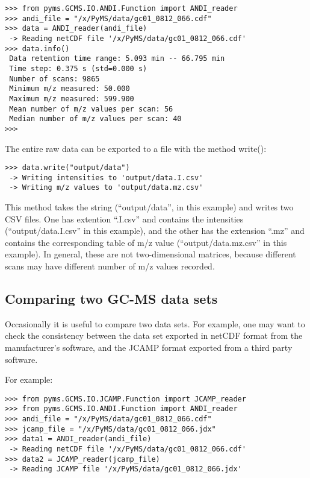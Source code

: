 \begin{verbatim}
>>> from pyms.GCMS.IO.ANDI.Function import ANDI_reader
>>> andi_file = "/x/PyMS/data/gc01_0812_066.cdf"
>>> data = ANDI_reader(andi_file)
 -> Reading netCDF file '/x/PyMS/data/gc01_0812_066.cdf'
>>> data.info()
 Data retention time range: 5.093 min -- 66.795 min
 Time step: 0.375 s (std=0.000 s)
 Number of scans: 9865
 Minimum m/z measured: 50.000
 Maximum m/z measured: 599.900
 Mean number of m/z values per scan: 56
 Median number of m/z values per scan: 40
>>>
\end{verbatim}

The entire raw data can be exported to a file with the method 
write():

\begin{verbatim}
>>> data.write("output/data")
 -> Writing intensities to 'output/data.I.csv'
 -> Writing m/z values to 'output/data.mz.csv'
\end{verbatim}

This method takes the string (``output/data'', in this example)
and writes two CSV files. One has extention ``.I.csv'' and
contains the intensities (``output/data.I.csv'' in this example),
and the other has the extension ``.mz'' and contains the
corresponding table of m/z value (``output/data.mz.csv'' in
this example). In general, these are not two-dimensional matrices,
because different scans may have different number of m/z
values recorded.

\subsection{Comparing two GC-MS data sets}


Occasionally it is useful to compare two data sets. For example,
one may want to check the consistency between the data set
exported in netCDF format from the manufacturer's software, and
the JCAMP format exported from a third party software.

For example:

\begin{verbatim}
>>> from pyms.GCMS.IO.JCAMP.Function import JCAMP_reader
>>> from pyms.GCMS.IO.ANDI.Function import ANDI_reader
>>> andi_file = "/x/PyMS/data/gc01_0812_066.cdf"
>>> jcamp_file = "/x/PyMS/data/gc01_0812_066.jdx"
>>> data1 = ANDI_reader(andi_file)
 -> Reading netCDF file '/x/PyMS/data/gc01_0812_066.cdf'
>>> data2 = JCAMP_reader(jcamp_file)
 -> Reading JCAMP file '/x/PyMS/data/gc01_0812_066.jdx'
\end{verbatim}

